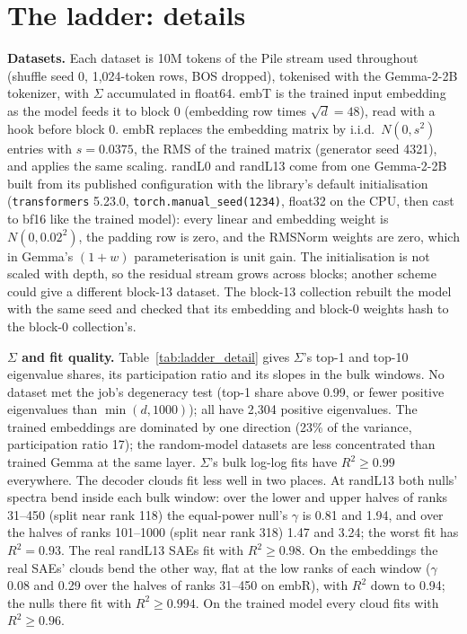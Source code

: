 \documentclass{article}
\newcommand{\Sig}{\Sigma}
\begin{document}
\section{The ladder: details}
\label{app:ladder}

\textbf{Datasets.} Each dataset is 10M tokens of the Pile stream used throughout (shuffle seed 0, 1,024-token rows, BOS dropped), tokenised with the Gemma-2-2B tokenizer, with $\Sig$ accumulated in float64. embT is the trained input embedding as the model feeds it to block 0 (embedding row times $\sqrt{d}=48$), read with a hook before block 0. embR replaces the embedding matrix by i.i.d.\ $N(0,s^2)$ entries with $s=0.0375$, the RMS of the trained matrix (generator seed 4321), and applies the same scaling. randL0 and randL13 come from one Gemma-2-2B built from its published configuration with the library's default initialisation (\texttt{transformers} 5.23.0, \texttt{torch.manual\_seed(1234)}, float32 on the CPU, then cast to bf16 like the trained model): every linear and embedding weight is $N(0, 0.02^2)$, the padding row is zero, and the RMSNorm weights are zero, which in Gemma's $(1+w)$ parameterisation is unit gain. The initialisation is not scaled with depth, so the residual stream grows across blocks; another scheme could give a different block-13 dataset. The block-13 collection rebuilt the model with the same seed and checked that its embedding and block-0 weights hash to the block-0 collection's.

\textbf{$\Sig$ and fit quality.} Table~\ref{tab:ladder_detail} gives $\Sig$'s top-1 and top-10 eigenvalue shares, its participation ratio and its slopes in the bulk windows. No dataset met the job's degeneracy test (top-1 share above 0.99, or fewer positive eigenvalues than $\min(d,1000)$); all have 2,304 positive eigenvalues. The trained embeddings are dominated by one direction (23\% of the variance, participation ratio 17); the random-model datasets are less concentrated than trained Gemma at the same layer. $\Sig$'s bulk log-log fits have $R^2\ge 0.99$ everywhere. The decoder clouds fit less well in two places. At randL13 both nulls' spectra bend inside each bulk window: over the lower and upper halves of ranks 31--450 (split near rank 118) the equal-power null's $\gamma$ is 0.81 and 1.94, and over the halves of ranks 101--1000 (split near rank 318) 1.47 and 3.24; the worst fit has $R^2=0.93$. The real randL13 SAEs fit with $R^2\ge 0.98$. On the embeddings the real SAEs' clouds bend the other way, flat at the low ranks of each window ($\gamma$ 0.08 and 0.29 over the halves of ranks 31--450 on embR), with $R^2$ down to 0.94; the nulls there fit with $R^2\ge 0.994$. On the trained model every cloud fits with $R^2\ge 0.96$.
\end{document}

